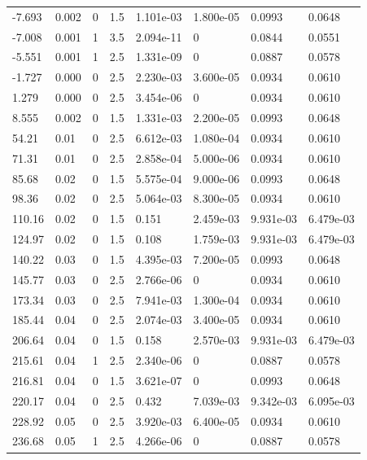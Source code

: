 \documentclass[preview]{standalone}
\begin{document}
{{\begin{tabular}{L{1.2cm}C{1.2cm} C{0.3cm}C{0.5cm} C{1.4cm}C{1.4cm} C{1.4cm}C{1.4cm}}
  -7.693  &  0.002  & 0     & 1.5 &  1.101e-03  & 1.800e-05  & 0.0993 &  0.0648   \\ 
  -7.008  &  0.001  & 1     & 3.5 &  2.094e-11  & 0  & 0.0844 &  0.0551   \\ 
  -5.551  &  0.001  & 1     & 2.5 &  1.331e-09  & 0  & 0.0887 &  0.0578   \\ 
  -1.727  &  0.000  & 0     & 2.5 &  2.230e-03  & 3.600e-05  & 0.0934 &  0.0610   \\ 
  1.279  &  0.000  & 0     & 2.5 &  3.454e-06  & 0  & 0.0934 &  0.0610   \\ 
  8.555  &  0.002  & 0     & 1.5 &  1.331e-03  & 2.200e-05  & 0.0993 &  0.0648   \\ 
  54.21  &  0.01  & 0     & 2.5 &  6.612e-03  & 1.080e-04  & 0.0934 &  0.0610   \\ 
  71.31  &  0.01  & 0     & 2.5 &  2.858e-04  & 5.000e-06  & 0.0934 &  0.0610   \\ 
  85.68  &  0.02  & 0     & 1.5 &  5.575e-04  & 9.000e-06  & 0.0993 &  0.0648   \\ 
  98.36  &  0.02  & 0     & 2.5 &  5.064e-03  & 8.300e-05  & 0.0934 &  0.0610   \\ 
  110.16  &  0.02  & 0     & 1.5 &  0.151  & 2.459e-03  & 9.931e-03 &  6.479e-03   \\ 
  124.97  &  0.02  & 0     & 1.5 &  0.108  & 1.759e-03  & 9.931e-03 &  6.479e-03   \\ 
  140.22  &  0.03  & 0     & 1.5 &  4.395e-03  & 7.200e-05  & 0.0993 &  0.0648   \\ 
  145.77  &  0.03  & 0     & 2.5 &  2.766e-06  & 0  & 0.0934 &  0.0610   \\ 
  173.34  &  0.03  & 0     & 2.5 &  7.941e-03  & 1.300e-04  & 0.0934 &  0.0610   \\ 
  185.44  &  0.04  & 0     & 2.5 &  2.074e-03  & 3.400e-05  & 0.0934 &  0.0610   \\ 
  206.64  &  0.04  & 0     & 1.5 &  0.158  & 2.570e-03  & 9.931e-03 &  6.479e-03   \\ 
  215.61  &  0.04  & 1     & 2.5 &  2.340e-06  & 0  & 0.0887 &  0.0578   \\ 
  216.81  &  0.04  & 0     & 1.5 &  3.621e-07  & 0  & 0.0993 &  0.0648   \\ 
  220.17  &  0.04  & 0     & 2.5 &  0.432  & 7.039e-03  & 9.342e-03 &  6.095e-03   \\ 
  228.92  &  0.05  & 0     & 2.5 &  3.920e-03  & 6.400e-05  & 0.0934 &  0.0610   \\ 
  236.68  &  0.05  & 1     & 2.5 &  4.266e-06  & 0  & 0.0887 &  0.0578   \\ 

\end{tabular}}}
\end{document}
